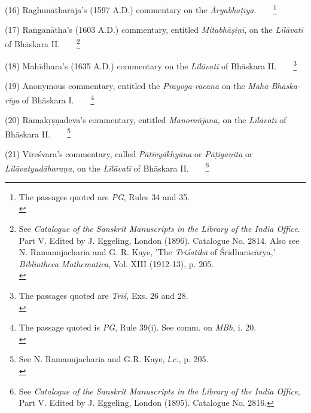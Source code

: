\documentclass[10pt, openany]{book}
\begin{document}
(16) Raghunātharāja's (1597 A.D.) commentary on the \textit{Āryabhaṭīya.}~~~~\renewcommand{\thefootnote}{\hspace{-4.5mm} 3}\footnote{\hspace{-2mm} \englishfont The passages quoted are \textit{PG}, Rules 34 and 35.\\}
\vspace{2mm}

(17) Raṅganātha's (1603 A.D.) commentary, entitled \textit{Mitabhāṣiṇī}, on the\textit{ Līlāvatī }of Bhāskara II.~~~~\renewcommand{\thefootnote}{\hspace{-4.5mm} 4}\footnote{\hspace{-2mm} \englishfont See \textit{Catalogue of the Sanskrit Manuscripts in the Library of the India Office}. Part V. Edited by J. Eggeling, London (1896). Catalogue No. 2814. Also see N. Ramanujacharia and G. R. Kaye, 'The \textit{Triśatikā} of Śrīdharācārya,' \textit{Bibliotheca Mathematica}, Vol. XIII (1912-13), p. 205.\\}
\vspace{2mm}

(18) Mahīdhara's (1635 A.D.) commentary on the \textit{Līlāvatī} of Bhāskara II.~~~~\renewcommand{\thefootnote}{\hspace{-4.5mm} 5}\footnote{\hspace{-2mm} \englishfont The passages quoted are \textit{Triś}, Exs. 26 and 28.\\}
\vspace{2mm}

{(19) Anonymous commentary, entitled the \textit{Prayoga-racanā} on the \textit{Mahā-Bhāska-rīya }of Bhāskara I.}~~~~\renewcommand{\thefootnote}{\hspace{-4.5mm} 6}\footnote{\hspace{-2mm} \englishfont The passage quoted is \textit{PG}, Rule 39(i). See comm. on \textit{MBh}, i. 20.\\}
\vspace{2mm}

{(20) Rāmakṛṣṇadeva's commentary, entitled\textit{ Manorañjana,} on the \textit{Līlāvatī} of Bhāskara II.}~~~~\renewcommand{\thefootnote}{\hspace{-4.5mm} 7}\footnote{\hspace{-2mm} \englishfont See N. Ramanujacharia and G.R. Kaye, \textit{l.c.}, p. 205.\\}
\vspace{2mm}

{(21) Vīreśvara's commentary, called \textit{Pāṭīvyākhyāna} or \textit{Pāṭīgaṇita} or \textit{Lilāvatyudāharaṇa}, on the \textit{Līlāvatī} of Bhāskara II.}~~~~\renewcommand{\thefootnote}{\hspace{-4.5mm} 8}\footnote{\hspace{-2mm} \englishfont See \textit{Catalogue of the Sanskrit Manuscripts in the Library of the India Office}, Part V. Edited by J. Eggeling, London (1895). Catalogue No. 2816.}
\end{document}
